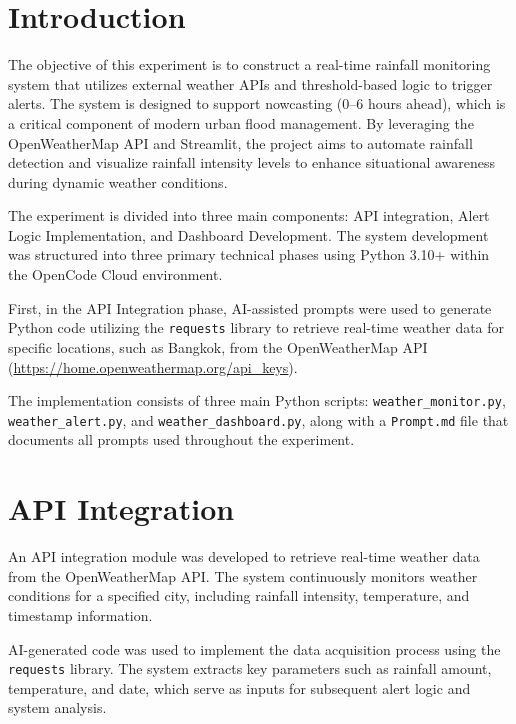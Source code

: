 \documentclass[12pt]{article}
\begin{document}
\pagestyle{fancy}
\setcounter{page}{1}

\section{Introduction}

The objective of this experiment is to construct a real-time rainfall monitoring system that utilizes external weather APIs and threshold-based logic to trigger alerts. The system is designed to support nowcasting (0--6 hours ahead), which is a critical component of modern urban flood management. By leveraging the OpenWeatherMap API and Streamlit, the project aims to automate rainfall detection and visualize rainfall intensity levels to enhance situational awareness during dynamic weather conditions.

The experiment is divided into three main components: API integration, Alert Logic Implementation, and Dashboard Development. The system development was structured into three primary technical phases using Python 3.10+ within the OpenCode Cloud environment.

First, in the API Integration phase, AI-assisted prompts were used to generate Python code utilizing the \texttt{requests} library to retrieve real-time weather data for specific locations, such as Bangkok, from the OpenWeatherMap API (\url{https://home.openweathermap.org/api\_keys}).

The implementation consists of three main Python scripts: \texttt{weather\_monitor.py}, \texttt{weather\_alert.py}, and \texttt{weather\_dashboard.py}, along with a \texttt{Prompt.md} file that documents all prompts used throughout the experiment.

\section{API Integration}

An API integration module was developed to retrieve real-time weather data from the OpenWeatherMap API. The system continuously monitors weather conditions for a specified city, including rainfall intensity, temperature, and timestamp information.

AI-generated code was used to implement the data acquisition process using the \texttt{requests} library. The system extracts key parameters such as rainfall amount, temperature, and date, which serve as inputs for subsequent alert logic and system analysis.
\end{document}
